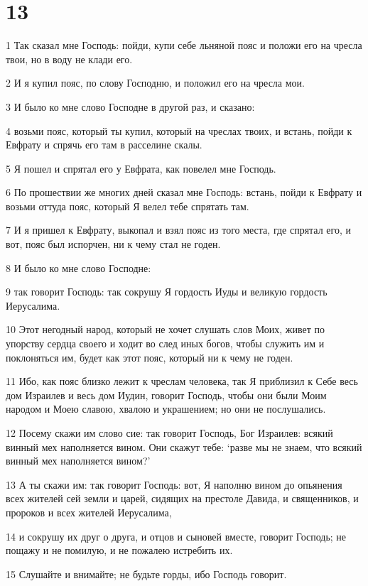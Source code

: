 \chapter{13}

\par 1 Так сказал мне Господь: пойди, купи себе льняной пояс и положи его на чресла твои, но в воду не клади его.
\par 2 И я купил пояс, по слову Господню, и положил его на чресла мои.
\par 3 И было ко мне слово Господне в другой раз, и сказано:
\par 4 возьми пояс, который ты купил, который на чреслах твоих, и встань, пойди к Евфрату и спрячь его там в расселине скалы.
\par 5 Я пошел и спрятал его у Евфрата, как повелел мне Господь.
\par 6 По прошествии же многих дней сказал мне Господь: встань, пойди к Евфрату и возьми оттуда пояс, который Я велел тебе спрятать там.
\par 7 И я пришел к Евфрату, выкопал и взял пояс из того места, где спрятал его, и вот, пояс был испорчен, ни к чему стал не годен.
\par 8 И было ко мне слово Господне:
\par 9 так говорит Господь: так сокрушу Я гордость Иуды и великую гордость Иерусалима.
\par 10 Этот негодный народ, который не хочет слушать слов Моих, живет по упорству сердца своего и ходит во след иных богов, чтобы служить им и поклоняться им, будет как этот пояс, который ни к чему не годен.
\par 11 Ибо, как пояс близко лежит к чреслам человека, так Я приблизил к Себе весь дом Израилев и весь дом Иудин, говорит Господь, чтобы они были Моим народом и Моею славою, хвалою и украшением; но они не послушались.
\par 12 Посему скажи им слово сие: так говорит Господь, Бог Израилев: всякий винный мех наполняется вином. Они скажут тебе: `разве мы не знаем, что всякий винный мех наполняется вином?'
\par 13 А ты скажи им: так говорит Господь: вот, Я наполню вином до опьянения всех жителей сей земли и царей, сидящих на престоле Давида, и священников, и пророков и всех жителей Иерусалима,
\par 14 и сокрушу их друг о друга, и отцов и сыновей вместе, говорит Господь; не пощажу и не помилую, и не пожалею истребить их.
\par 15 Слушайте и внимайте; не будьте горды, ибо Господь говорит.

